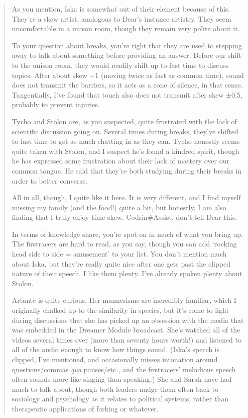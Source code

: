 \begin{quote}
As you mention, Iska is somewhat out of their element because of this. They're a skew artist, analogous to Dear's instance artistry. They seem uncomfortable in a unison room, though they remain very polite about it.

To your question about breaks, you're right that they are used to stepping away to talk about something before providing an answer. Before our shift to the unison room, they would readily shift up to fast time to discuss topics. After about skew +1 (moving twice as fast as common time), sound does not transmit the barriers, so it acts as a cone of silence, in that sense. Tangentially, I've found that touch also does not transmit after skew ±0.5, probably to prevent injuries.

Tycho and Stolon are, as you suspected, quite frustrated with the lack of scientific discussion going on. Several times during breaks, they've shifted to fast time to get as much chatting in as they can. Tycho honestly seems quite taken with Stolon, and I suspect he's found a kindred spirit, though he has expressed some frustration about their lack of mastery over our common tongue. He said that they're both studying during their breaks in order to better converse.

All in all, though, I quite like it here. It is very different, and I find myself missing my family (and the food!) quite a bit, but honestly, I am also finding that I truly enjoy time skew. Codrin\#Assist, don't tell Dear this.

In terms of knowledge share, you're spot on in much of what you bring up. The firstracers are hard to read, as you say, though you can add `rocking head side to side = amusement' to your list. You don't mention much about Iska, but they're really quite nice after one gets past the clipped nature of their speech. I like them plenty. I've already spoken plenty about Stolon.

Artante is quite curious. Her mannerisms are incredibly familiar, which I originally chalked up to the similarity in species, but it's come to light during discussions that she has picked up an obsession with the media that was embedded in the Dreamer Module broadcast. She's watched all of the videos several times over (more than seventy hours worth!) and listened to all of the audio enough to know how things sound. (Iska's speech is clipped, I've mentioned, and occasionally misses intonation around questions/commas \emph{qua} pauses/etc., and the firstracers' melodious speech often sounds more like singing than speaking.) She and Sarah have had much to talk about, though both leaders nudge them often back to sociology and psychology as it relates to political systems, rather than therapeutic applications of forking or whatever.


\end{quote}
